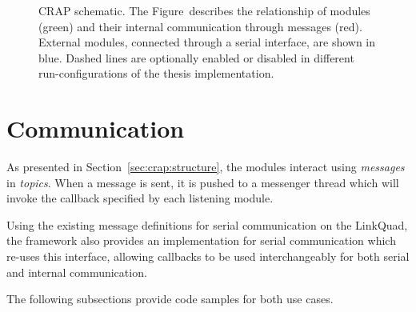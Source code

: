 \begin{figure}[H]
{
        }
        \caption{CRAP schematic. The Figure~describes the relationship of modules (green) and their internal communication through messages (red).
        External modules, connected through a serial interface, are shown in blue. Dashed lines are optionally enabled or disabled in different run-configurations of the thesis implementation.}
        \label{fig:crap:schematic}
    \end{figure}

    \section{Communication}
    \label{sec:crap:communication}
        As presented in Section~\ref{sec:crap:structure}, the modules interact using
        \textit{messages} in \textit{topics}. When a message is sent, it
        is pushed to a messenger thread which will invoke the callback specified
        by each listening module.

        Using the existing message definitions for serial communication on the LinkQuad,
        the framework also provides an implementation for serial communication
        which re-uses this interface, allowing callbacks to be used interchangeably
        for both serial and internal communication.

        The following subsections provide code samples for both use cases.

